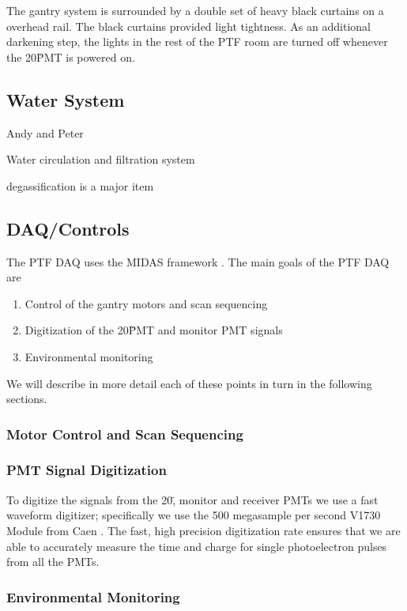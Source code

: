The gantry system is surrounded by a double set of heavy black
curtains on a overhead rail.  The black curtains provided light tightness.
As an additional darkening step, the lights in the rest of the PTF room
are turned off whenever the 20\" PMT is powered on.


\subsection{Water System}
Andy and Peter

Water circulation and filtration system

degassification is a major item


\subsection{DAQ/Controls}
\label{Sec:DAQ_Controls}

The PTF DAQ uses the MIDAS framework \cite{MIDASRef}.  The main goals of the PTF DAQ are

\begin{enumerate}
\item Control of the gantry motors and scan sequencing
\item Digitization of the 20\" PMT and monitor PMT signals 
\item Environmental monitoring
\end{enumerate}

We will describe in more detail each of these points in turn in the following sections.

\subsubsection{Motor Control and Scan Sequencing}


\subsubsection{PMT Signal Digitization}

To digitize the signals from the 20\", monitor and receiver PMTs we use a fast waveform digitizer; specifically
we use the 500 megasample per second V1730 Module from Caen \cite{V1730Ref}.  The fast, high precision digitization rate ensures that we
are able to accurately measure the time and charge for single photoelectron pulses from all the PMTs.


\subsubsection{Environmental Monitoring}




